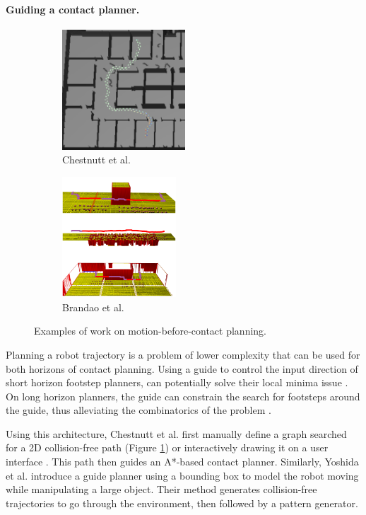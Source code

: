 \paragraph{Guiding a contact planner.}
\begin{figure}[ht]
    \centering
    \captionsetup[subfigure]{justification=centering}
    \begin{subfigure}[t]{0.48\linewidth}
    \includegraphics[width=\textwidth,height=4.5cm]{Figures/Chapter_SOTA//chestnutt_2004.png}
    \caption{Chestnutt et al. \cite{chestnutt_tiered_planning_2004}}
    \label{fig:cp_mbc_works_0}
    \end{subfigure}
    \begin{subfigure}[t]{0.48\linewidth}
    \includegraphics[width=\textwidth,height=4.5cm]{Figures/Chapter_SOTA//brandao_traversability.png}
    \caption{Brandao et al. \cite{brandao_multimode_2019}}
    \label{fig:cp_mbc_works_1}
    \end{subfigure}
    \caption{Examples of work on motion-before-contact planning.}
\end{figure}
Planning a robot trajectory is a problem of lower complexity that can be used for both horizons of contact planning.
Using a guide to control the input direction of short horizon footstep planners, can potentially solve their local minima issue \cite{norby_skd_2022}. 
On long horizon planners, the guide can constrain the search for footsteps around the guide, thus alleviating the combinatorics of the problem \cite{Hildebrandt_lola_2017}.

Using this architecture, Chestnutt et al. first manually define a graph searched for a 2D collision-free path \cite{chestnutt_tiered_planning_2004, Chestnutt2007NavigationPF} (Figure \ref{fig:cp_mbc_works_0}) or interactively drawing it on a user interface \cite{chestnutt_2009_interactive_guide}. This path then guides an A*-based contact planner.
Similarly, Yoshida et al. \cite{yoshida_2005} introduce a guide planner using a bounding box to model the robot moving while manipulating a large object. Their method generates collision-free trajectories to go through the environment, then followed by a pattern generator.

